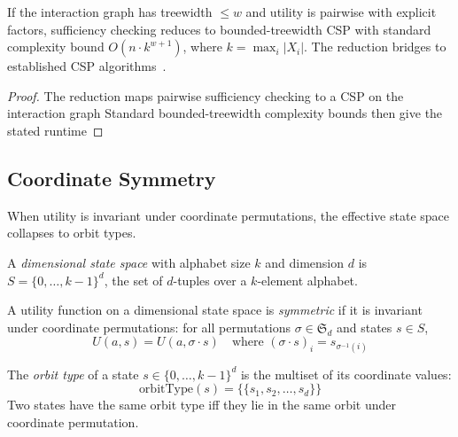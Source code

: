 \begin{theorem}\label{thm:treewidth}
If the interaction graph has treewidth $\le w$ and utility is pairwise with explicit factors, sufficiency checking reduces to bounded-treewidth CSP with standard complexity bound $O(n \cdot k^{w+1})$, where $k = \max_i |X_i|$. The reduction bridges to established CSP algorithms~\cite{bodlaender1993tourist, freuder1990complexity, bessiere2013detecting}.
\end{theorem}


\begin{proof}
The reduction maps pairwise sufficiency checking to a CSP on the interaction graph  Standard bounded-treewidth complexity bounds then give the stated runtime 
\end{proof}

\subsection{Coordinate Symmetry}\label{sec:tract-symmetry}

When utility is invariant under coordinate permutations, the effective state space collapses to orbit types.

\begin{definition}\label{def:dimensional}
A \emph{dimensional state space} with alphabet size $k$ and dimension $d$ is $S = \{0, \ldots, k-1\}^d$, the set of $d$-tuples over a $k$-element alphabet.
\end{definition}

\begin{definition}\label{def:symmetric}
A utility function on a dimensional state space is \emph{symmetric} if it is invariant under coordinate permutations: for all permutations $\sigma \in \mathfrak{S}_d$ and states $s \in S$,
\[
U(a, s) = U(a, \sigma \cdot s) \quad \text{where } (\sigma \cdot s)_i = s_{\sigma^{-1}(i)}
\]
\end{definition}

\begin{definition}\label{def:orbit-type}
The \emph{orbit type} of a state $s \in \{0, \ldots, k-1\}^d$ is the multiset of its coordinate values:
\[
\text{orbitType}(s) = \{\!\{s_1, s_2, \ldots, s_d\}\!\}
\]
Two states have the same orbit type iff they lie in the same orbit under coordinate permutation.
\end{definition}

